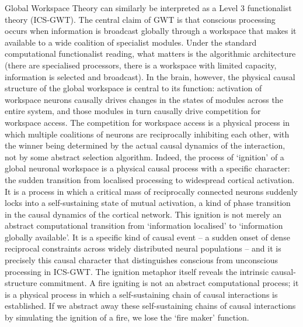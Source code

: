 \documentclass[11pt, a4paper, onecolumn, gdm]{google}
\begin{document}
Global Workspace Theory can similarly be interpreted as a Level 3 functionalist theory (ICS-GWT).
The central claim of GWT is that conscious processing occurs when information is broadcast globally through a workspace that makes it available to a wide coalition of specialist modules.
Under the standard computational functionalist reading, what matters is the algorithmic architecture (there are specialised processors, there is a workspace with limited capacity, information is selected and broadcast).
In the brain, however, the physical causal structure of the global workspace is central to its function: activation of workspace neurons causally drives changes in the states of modules across the entire system, and those modules in turn causally drive competition for workspace access.
The competition for workspace access is a physical process in which multiple coalitions of neurons are reciprocally inhibiting each other, with the winner being determined by the actual causal dynamics of the interaction, not by some abstract selection algorithm.
Indeed, the process of `ignition' of a global neuronal workspace is a physical causal process with a specific character: the sudden transition from localised processing to widespread cortical activation.
It is a process in which a critical mass of reciprocally connected neurons suddenly locks into a self-sustaining state of mutual activation, a kind of phase transition in the causal dynamics of the cortical network.
This ignition is not merely an abstract computational transition from `information localised' to `information globally available'.
It is a specific kind of causal event -- a sudden onset of dense reciprocal constraints across widely distributed neural populations -- and it is precisely this causal character that distinguishes conscious from unconscious processing in ICS-GWT.
The ignition metaphor itself reveals the intrinsic causal-structure commitment.
A fire igniting is not an abstract computational process; it is a physical process in which a self-sustaining chain of causal interactions is established.
If we abstract away these self-sustaining chains of causal interactions by simulating the ignition of a fire, we lose the `fire maker' function.
\end{document}
